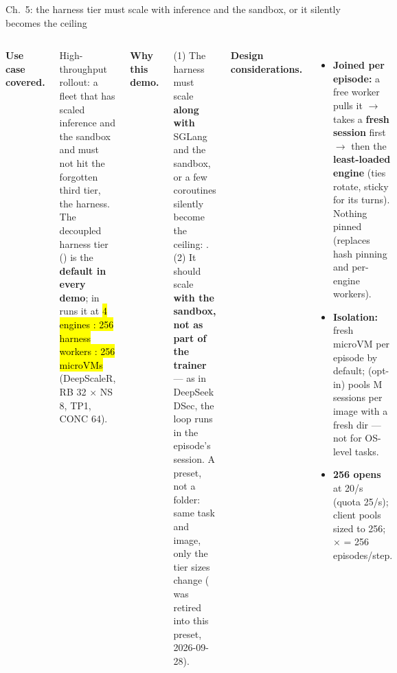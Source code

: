 \begin{frame}{Ch.\ 5: the harness tier must scale with inference and the sandbox, or it silently becomes the ceiling}
\begin{columns}[T]
{\footnotesize\textbf{\color{awsteal}Use case covered.}\par}
{\scriptsize High-throughput rollout: a fleet that has scaled inference and the sandbox and must not hit the forgotten third tier, the harness. The decoupled harness tier () is the \textbf{default in every demo};  in  runs it at \hl{4 engines : 256 harness workers : 256 microVMs} (DeepScaleR, RB 32 $\times$ NS 8, TP1, CONC 64).\par}
\vspace{2mm}
{\footnotesize\textbf{\color{awsteal}Why this demo.}\par}
{\scriptsize (1) The harness must scale \textbf{along with} SGLang and the sandbox, or a few coroutines silently become the ceiling: \hl{}. (2) It should scale \textbf{with the sandbox, not as part of the trainer} --- as in DeepSeek DSec, the loop runs in the episode's session. A preset, not a folder: same task and image, only the tier sizes change ( was retired into this preset, 2026-09-28).\par}
{\footnotesize\textbf{\color{awsteal}Design considerations.}\par}
\begin{itemize}\scriptsize\setlength{\itemsep}{1.4mm}
\item \textbf{Joined per episode:} a free worker pulls it $\rightarrow$ takes a \textbf{fresh session} first $\rightarrow$ then the \textbf{least-loaded engine} (ties rotate, sticky for its turns). Nothing pinned (replaces hash pinning and per-engine workers).
\item \textbf{Isolation:} fresh microVM per episode by default;  (opt-in) pools M sessions per image with a fresh  dir --- not for OS-level tasks.
\item \textbf{256 opens} at  20/s (quota 25/s); client pools sized to 256;  $\times$  = 256 episodes/step.
\end{itemize}
\end{columns}
\end{frame}

